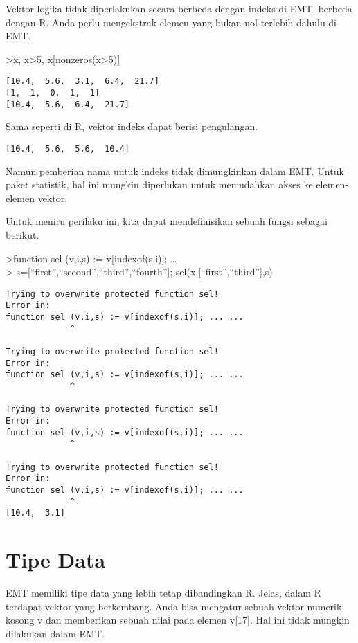 \documentclass[
]{book}
\begin{document}
Vektor logika tidak diperlakukan secara berbeda dengan indeks di EMT, berbeda dengan R. Anda perlu mengekstrak elemen yang bukan nol terlebih dahulu di EMT.

\textgreater x, x\textgreater5, x{[}nonzeros(x\textgreater5){]}

\begin{verbatim}
[10.4,  5.6,  3.1,  6.4,  21.7]
[1,  1,  0,  1,  1]
[10.4,  5.6,  6.4,  21.7]
\end{verbatim}

Sama seperti di R, vektor indeks dapat berisi pengulangan.

\begin{verbatim}
[10.4,  5.6,  5.6,  10.4]
\end{verbatim}

Namun pemberian nama untuk indeks tidak dimungkinkan dalam EMT. Untuk paket statistik, hal ini mungkin diperlukan untuk memudahkan akses ke elemen-elemen vektor.

Untuk meniru perilaku ini, kita dapat mendefinisikan sebuah fungsi sebagai berikut.

\textgreater function sel (v,i,s) := v{[}indexof(s,i){]}; \ldots{}\\
\textgreater{} s={[}``first'',``second'',``third'',``fourth''{]}; sel(x,{[}``first'',``third''{]},s)

\begin{verbatim}
Trying to overwrite protected function sel!
Error in:
function sel (v,i,s) := v[indexof(s,i)]; ... ...
             ^

Trying to overwrite protected function sel!
Error in:
function sel (v,i,s) := v[indexof(s,i)]; ... ...
             ^

Trying to overwrite protected function sel!
Error in:
function sel (v,i,s) := v[indexof(s,i)]; ... ...
             ^

Trying to overwrite protected function sel!
Error in:
function sel (v,i,s) := v[indexof(s,i)]; ... ...
             ^
[10.4,  3.1]
\end{verbatim}

\chapter{Tipe Data}\label{tipe-data}

EMT memiliki tipe data yang lebih tetap dibandingkan R. Jelas, dalam R terdapat vektor yang berkembang. Anda bisa mengatur sebuah vektor numerik kosong v dan memberikan sebuah nilai pada elemen v{[}17{]}. Hal ini tidak mungkin dilakukan dalam EMT.
\end{document}
